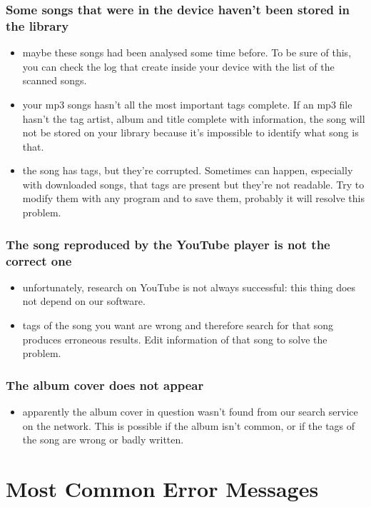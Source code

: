 \subsection*{Some songs that were in the device haven't been stored in the
library}
\begin{itemize}
  \item maybe these songs had been analysed some time before. To be sure of
  this, you can check the log that  create inside your device with
  the list of the scanned songs.
  \item your mp3 songs hasn't all the most important tags complete. If an mp3
  file hasn't the tag artist, album and title complete with information, the
  song will not be stored on your library because it's impossible to identify
  what song is that.
  \item the song has tags, but they're corrupted. Sometimes can happen, especially
  with downloaded songs, that tags are present but they're not readable. Try to 
  modify them with any program and to save them, probably it will resolve this problem.
\end{itemize}

\subsection*{The song reproduced by the YouTube player is not the correct one}
\begin{itemize}
  \item unfortunately, research on YouTube is not always successful: this thing
   does not depend on our software.
  \item tags of the song you want are wrong and therefore
   search for that song produces erroneous results. Edit information
   of that song to solve the problem.
\end{itemize}

\subsection*{The album cover does not appear}
\begin{itemize}
  \item apparently the album cover in question wasn't
   found from our search service on the network. This is possible if
   the album isn't common, or if the tags of the
   song are wrong or badly written.
\end{itemize}

\appendix %
\chapter{Most Common Error Messages}
\thispagestyle{fancy}

